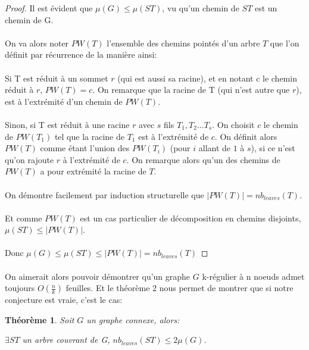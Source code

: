 \documentclass[a4paper]{article}
\newtheorem{theorem}{Théorème}
\theoremstyle{definition}
\theoremstyle{remark}
\begin{document}
\begin{proof}
Il est évident que $\mu(G) \leq \mu(ST)$, vu qu'un chemin de $ST$ est un
chemin de G.

\paragraph{}
On va alors noter $PW(T)$ l'ensemble des chemins pointés d'un arbre $T$ que l'on définit par récurrence de la manière ainsi:

\paragraph{}
Si T est réduit à un sommet $r$ (qui est aussi sa racine), et en notant c le chemin réduit à $r$, $PW(T) = {c}$. On remarque que la racine de T (qui n'est autre que $r$), est à l'extrémité d'un chemin de $PW(T)$.

\paragraph{}
Sinon, si T est réduit à une racine $r$ avec $s$ fils $T_{1}, T_{2} ... T_{s}$. On choisit $c$ le chemin de $PW(T_{1})$ tel que la racine de $T_{1}$ est à l'extrémité de $c$. On définit alors $PW(T)$ comme étant l'union des $PW(T_{i})$ (pour $i$ allant de $1$ à $s$), si ce n'est qu'on rajoute $r$ à l'extrémité de $c$. On remarque alors qu'un des chemins de $PW(T)$ a pour extrémité la racine de $T$.

\paragraph{}
On démontre facilement par induction structurelle que $|PW(T)|= nb_{leaves}(T)$.


\paragraph{}
Et comme $PW(T)$ est un cas particulier de décomposition en chemins disjoints, $\mu(ST) \leq |PW(T)|$.


\paragraph{}
Donc $\mu(G) \leq \mu(ST) \leq |PW(T)| = nb_{leaves}(T)$
\end{proof}


\paragraph{}
On aimerait alors pouvoir démontrer qu'un graphe $G$ k-régulier à n noeuds admet toujours $O(\frac{n}{k})$ feuilles. Et le théorème 2 nous
permet de montrer que si notre conjecture est vraie, c'est le cas:
\begin{theorem}
Soit $G$ un graphe connexe, alors:

$\exists ST$ un arbre couvrant de G, $nb_{leaves}(ST)\leq 2\mu(G)$.
\end{theorem}
\end{document}
